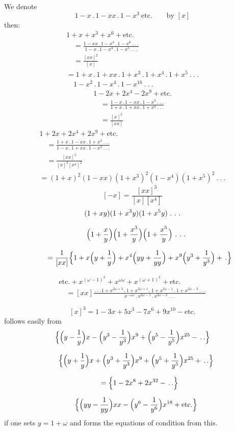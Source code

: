 We denote
\[
1-x\,.\,1-xx\,.\,1-x^3\ \text{etc.}\qquad\text{by }[x]
\]
then:
\[
\begin{gathered}
1+x+x^3+x^6+\text{etc.}
\\[7pt]\quad{}=\frac{1-xx\,.\,1-x^4\,.\,1-x^6\ .\ .\ .}{1-x\,.\,1-x^3\,.\,1-x^5\ .\ .\ .}\\[7pt]\quad{}=\frac{[xx]^2}{[x]}\\[7pt]
=1+x\,.\,1+xx\,.\,1+x^3\,.\,1+x^4\,.\,1+x^5\ .\ .\ .\\[7pt]\quad{}1-x^2\,.\,1-x^4\,.\,1-x^{16}\ .\ .\ .
\end{gathered}
\]
\[
\begin{gathered}1-2x+2x^4-2x^9+\text{etc.}
\\[7pt]\quad{}=\frac{1-x\,.\,1-xx\,.\,1-x^3\ .\ .\ .}{1+x\,.\,1+xx\,.\,1+x^3\ .\ .\ .}\\[7pt]\quad{}=\frac{[x]^2}{[xx]}\end{gathered}
\]
\[
\begin{gathered}
1+2x+2x^4+2x^9+\text{etc.}
\\[7pt]\quad{}=\frac{1+x\,.\,1-xx\,.\,1+x^3\ .\ .\ .}{1-x\,.\,1+xx\,.\,1-x^3\ .\ .\ .}\\[7pt]\quad{}=\frac{[xx]^5}{[x]^2[x^4]^2}\\[7pt]
=(1+x)^2(1-xx)(1+x^3)^2(1-x^4)(1+x^5)^2\ .\ .\ .
\end{gathered}
\]
\[
[-x]=\frac{[xx]^3}{[x][x^4]}
\]
\[
\begin{gathered}
(1+xy)(1+x^3y)(1+x^5y)\ .\ .\ .
\\[7pt]\quad{}\Bigl(1+\frac{x}{y}\Bigr)\Bigl(1+\frac{x^3}{y}\Bigr)\Bigl(1+\frac{x^5}{y}\Bigr)\ .\ .\ .\\[7pt]
\qquad=\frac{1}{[xx]}\Bigl\{1+x\Bigl(y+\frac{1}{y}\Bigr)+x^4\Bigl(yy+\frac{1}{yy}\Bigr)+x^9\Bigl(y^3+\frac{1}{y^3}\Bigr)+\,.\Bigr\}
\end{gathered}
\]

\[
\begin{gathered}\text{etc.}+x^{(\omega-1)^2}+x^{\omega\omega}+x^{(\omega+1)^2}+\text{etc.}
\\[7pt]\quad{}=[xx]\frac{\ .\ .\ .1+x^{2\omega+3}\,.\,1+x^{2\omega+1}\,.\,1+x^{2\omega-1}\,.\,1+x^{2\omega-3}\ .\ .\ .}{x^{-\omega\omega}\,.\,x^{2\omega-1}\,.\,x^{2\omega-3}\ .\ .\ .}\end{gathered}
\]

\[
[x]^3=1-3x+5x^3-7x^6+9x^{10}-\text{etc.}
\]
follows easily from
\[
\begin{gathered}
\Bigl\{\Bigl(y-\frac{1}{y}\Bigr)x-\Bigl(y^3-\frac{1}{y^3}\Bigr)x^9+\Bigl(y^5-\frac{1}{y^5}\Bigr)x^{25}-\,.\,.\Bigr\}
\\[7pt]\quad{}\Bigl\{\Bigl(y+\frac{1}{y}\Bigr)x+\Bigl(y^3+\frac{1}{y^3}\Bigr)x^9+\Bigl(y^5+\frac{1}{y^5}\Bigr)x^{25}+\,.\,.\Bigr\}\\[7pt]
\qquad=\Bigl\{1-2x^8+2x^{32}-\,.\,.\Bigr\}
\\[7pt]\quad{}\Bigl\{\Bigl(yy-\frac{1}{yy}\Bigr)xx-\Bigl(y^6-\frac{1}{y^6}\Bigr)x^{18}+\text{etc.}\Bigr\}
\end{gathered}
\]
if one sets \(y=1+\omega\) and forms the equations of condition from this.
\clearpage
\endgroup
